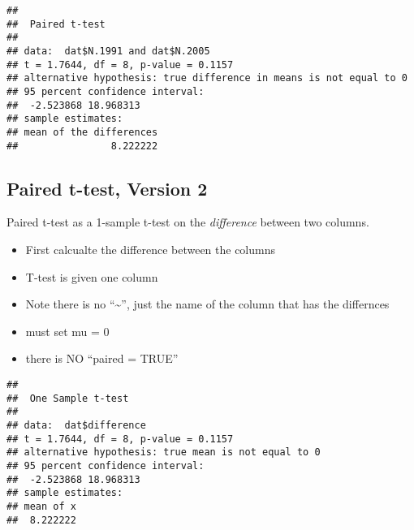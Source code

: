 \documentclass[
]{book}
\newenvironment{Shaded}{\begin{snugshade}}{\end{snugshade}}
\newcommand{\AttributeTok}[1]{\textcolor[rgb]{0.77,0.63,0.00}{#1}}
\newcommand{\CommentTok}[1]{\textcolor[rgb]{0.56,0.35,0.01}{\textit{#1}}}
\newcommand{\DecValTok}[1]{\textcolor[rgb]{0.00,0.00,0.81}{#1}}
\newcommand{\FloatTok}[1]{\textcolor[rgb]{0.00,0.00,0.81}{#1}}
\newcommand{\FunctionTok}[1]{\textcolor[rgb]{0.00,0.00,0.00}{#1}}
\newcommand{\NormalTok}[1]{#1}
\newcommand{\OtherTok}[1]{\textcolor[rgb]{0.56,0.35,0.01}{#1}}
\newcommand{\SpecialCharTok}[1]{\textcolor[rgb]{0.00,0.00,0.00}{#1}}
\providecommand{\tightlist}{%
  \setlength{\itemsep}{0pt}\setlength{\parskip}{0pt}}
\begin{document}
\begin{verbatim}
## 
##  Paired t-test
## 
## data:  dat$N.1991 and dat$N.2005
## t = 1.7644, df = 8, p-value = 0.1157
## alternative hypothesis: true difference in means is not equal to 0
## 95 percent confidence interval:
##  -2.523868 18.968313
## sample estimates:
## mean of the differences 
##                8.222222
\end{verbatim}

\hypertarget{paired-t-test-version-2}{%
\subsection{Paired t-test, Version 2}\label{paired-t-test-version-2}}

Paired t-test as a 1-sample t-test on the \emph{difference} between two columns.

\begin{itemize}
\tightlist
\item
  First calcualte the difference between the columns
\item
  T-test is given one column
\item
  Note there is no ``\textasciitilde{}'', just the name of the column that has the differnces
\item
  must set mu = 0
\item
  there is NO ``paired = TRUE''
\end{itemize}

\begin{Shaded}
\end{Shaded}

\begin{verbatim}
## 
##  One Sample t-test
## 
## data:  dat$difference
## t = 1.7644, df = 8, p-value = 0.1157
## alternative hypothesis: true mean is not equal to 0
## 95 percent confidence interval:
##  -2.523868 18.968313
## sample estimates:
## mean of x 
##  8.222222
\end{verbatim}
\end{document}
